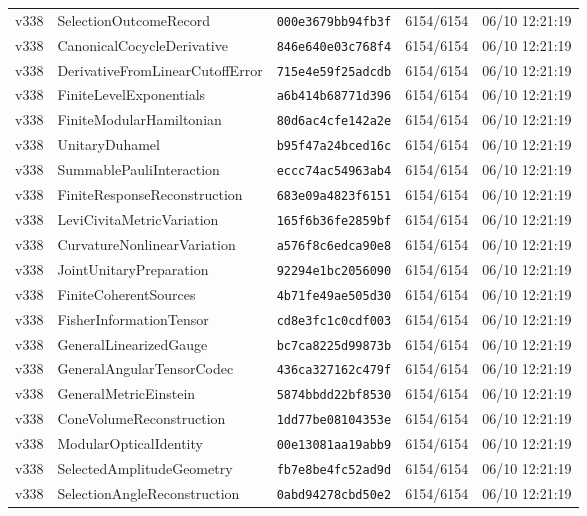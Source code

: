 \documentclass[11pt]{article}
\theoremstyle{definition}\newtheorem{deriv}{Derivation}
\begin{document}
{\begin{longtable}{@{}lllll@{}}
v338 & SelectionOutcomeRecord & \texttt{000e3679bb94fb3f} & 6154/6154 & 06/10 12:21:19 \\
v338 & CanonicalCocycleDerivative & \texttt{846e640e03c768f4} & 6154/6154 & 06/10 12:21:19 \\
v338 & DerivativeFromLinearCutoffError & \texttt{715e4e59f25adcdb} & 6154/6154 & 06/10 12:21:19 \\
v338 & FiniteLevelExponentials & \texttt{a6b414b68771d396} & 6154/6154 & 06/10 12:21:19 \\
v338 & FiniteModularHamiltonian & \texttt{80d6ac4cfe142a2e} & 6154/6154 & 06/10 12:21:19 \\
v338 & UnitaryDuhamel & \texttt{b95f47a24bced16c} & 6154/6154 & 06/10 12:21:19 \\
v338 & SummablePauliInteraction & \texttt{eccc74ac54963ab4} & 6154/6154 & 06/10 12:21:19 \\
v338 & FiniteResponseReconstruction & \texttt{683e09a4823f6151} & 6154/6154 & 06/10 12:21:19 \\
v338 & LeviCivitaMetricVariation & \texttt{165f6b36fe2859bf} & 6154/6154 & 06/10 12:21:19 \\
v338 & CurvatureNonlinearVariation & \texttt{a576f8c6edca90e8} & 6154/6154 & 06/10 12:21:19 \\
v338 & JointUnitaryPreparation & \texttt{92294e1bc2056090} & 6154/6154 & 06/10 12:21:19 \\
v338 & FiniteCoherentSources & \texttt{4b71fe49ae505d30} & 6154/6154 & 06/10 12:21:19 \\
v338 & FisherInformationTensor & \texttt{cd8e3fc1c0cdf003} & 6154/6154 & 06/10 12:21:19 \\
v338 & GeneralLinearizedGauge & \texttt{bc7ca8225d99873b} & 6154/6154 & 06/10 12:21:19 \\
v338 & GeneralAngularTensorCodec & \texttt{436ca327162c479f} & 6154/6154 & 06/10 12:21:19 \\
v338 & GeneralMetricEinstein & \texttt{5874bbdd22bf8530} & 6154/6154 & 06/10 12:21:19 \\
v338 & ConeVolumeReconstruction & \texttt{1dd77be08104353e} & 6154/6154 & 06/10 12:21:19 \\
v338 & ModularOpticalIdentity & \texttt{00e13081aa19abb9} & 6154/6154 & 06/10 12:21:19 \\
v338 & SelectedAmplitudeGeometry & \texttt{fb7e8be4fc52ad9d} & 6154/6154 & 06/10 12:21:19 \\
v338 & SelectionAngleReconstruction & \texttt{0abd94278cbd50e2} & 6154/6154 & 06/10 12:21:19 \\

\end{longtable}}
\end{document}
